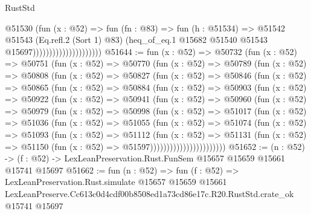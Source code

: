 \begin{lexlean}{RustStd}
\begin{coremodule}
                                        @51530
                                          (fun (x : @52) =>
                                          fun (fn : @83) =>
                                          fun (h : @51534) =>
                                          @51542
                                            @51543
                                            (Eq.refl.{2} (Sort 1) @83)
                                            (heq_of_eq.{1}
                                              @15682
                                              @51540
                                              @51543
                                              @15697)))))))))))))))))))))
@51644 := fun (x : @52) =>
  @50732
    (fun (x : @52) =>
    @50751
      (fun (x : @52) =>
      @50770
        (fun (x : @52) =>
        @50789
          (fun (x : @52) =>
          @50808
            (fun (x : @52) =>
            @50827
              (fun (x : @52) =>
              @50846
                (fun (x : @52) =>
                @50865
                  (fun (x : @52) =>
                  @50884
                    (fun (x : @52) =>
                    @50903
                      (fun (x : @52) =>
                      @50922
                        (fun (x : @52) =>
                        @50941
                          (fun (x : @52) =>
                          @50960
                            (fun (x : @52) =>
                            @50979
                              (fun (x : @52) =>
                              @50998
                                (fun (x : @52) =>
                                @51017
                                  (fun (x : @52) =>
                                  @51036
                                    (fun (x : @52) =>
                                    @51055
                                      (fun (x : @52) =>
                                      @51074
                                        (fun (x : @52) =>
                                        @51093
                                          (fun (x : @52) =>
                                          @51112
                                            (fun (x : @52) =>
                                            @51131
                                              (fun (x : @52) =>
                                              @51150 (fun (x : @52) => @51597)))))))))))))))))))))))
@51652 := (n : @52) ->
  (f : @52) -> LexLeanPreservation.Rust.FunSem @15657 @15659 @15661 @15741 @15697
@51662 := fun (n : @52) =>
  fun (f : @52) =>
  LexLeanPreservation.Rust.simulate
    @15657
    @15659
    @15661
    LexLeanPreserve.Cc613c0d4cdf00b8508ed1a73cd86e17c.R20.RustStd.crate_ok
    @15741
    @15697
\end{coremodule}
\end{lexlean}
